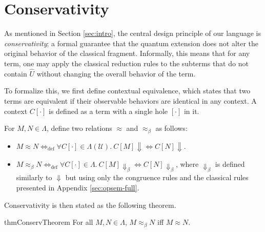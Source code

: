 \section{Conservativity}
As mentioned in Section \ref{sec:intro}, the central design principle of our language is \textit{conservativity}; a formal guarantee that the quantum extension does not alter the original behavior of the classical fragment.
Informally, this means that for any term, one may apply the classical reduction rules to the subterms that do not contain $\hat{U}$ without changing the overall behavior of the term.

To formalize this, we first define contextual equivalence, which states that two terms are equivalent if their observable behaviors are identical in any context.
A context $C[\cdot]$ is defined as a term with a single hole $[\cdot]$ in it.

\begin{dfn} \label{def:contextual-equiv}
  For $M, N \in \Lambda$, define two relations $\approx$ and $\approx_\beta$ as follows:
  \begin{itemize}
    \item $M\approx N \Leftrightarrow_\mathrm{def} \forall C[\cdot]\in\Lambda(\mathcal{U}).\ C[M] \Downarrow \Leftrightarrow C[N] \Downarrow$.
    \item $M\approx_\beta N \Leftrightarrow_\mathrm{def} \forall C[\cdot]\in\Lambda.\ C[M] \Downarrow_\beta \Leftrightarrow C[N] \Downarrow_\beta$, where $\Downarrow_\beta$ is defined similarly to $\Downarrow$ but using only the congruence rules and the classical rules presented in Appendix \ref{sec:opsem-full}.
  \end{itemize}
\end{dfn}

Conservativity is then stated as the following theorem.
\begin{restatable}[Conservativity]{thm}{ConservTheorem} \label{thm:conservativity}
  For all $M, N \in \Lambda$, $M \approx_\beta N$ iff $M \approx N$.
\end{restatable}
